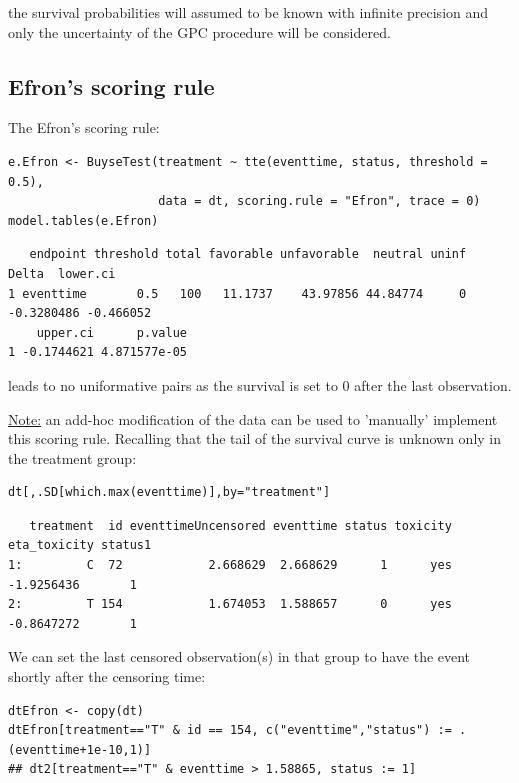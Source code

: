 \documentclass[12pt]{article}
\begin{document}
the survival probabilities will assumed to be known with infinite
precision and only the uncertainty of the GPC procedure will be
considered.

\subsection{Efron's scoring rule}
\label{sec:org9d66204}

The Efron's scoring rule:
\lstset{language=r,label= ,caption= ,captionpos=b,numbers=none}
\begin{lstlisting}
e.Efron <- BuyseTest(treatment ~ tte(eventtime, status, threshold = 0.5),
                     data = dt, scoring.rule = "Efron", trace = 0)
model.tables(e.Efron)
\end{lstlisting}

\begin{verbatim}
   endpoint threshold total favorable unfavorable  neutral uninf      Delta  lower.ci
1 eventtime       0.5   100   11.1737    43.97856 44.84774     0 -0.3280486 -0.466052
    upper.ci      p.value
1 -0.1744621 4.871577e-05
\end{verbatim}


leads to no uniformative pairs as the survival is set to 0 after the
last observation. 

\uline{Note:} an add-hoc modification of the data can be used to 'manually'
implement this scoring rule. Recalling that the tail of the survival
curve is unknown only in the treatment group:
\lstset{language=r,label= ,caption= ,captionpos=b,numbers=none}
\begin{lstlisting}
dt[,.SD[which.max(eventtime)],by="treatment"]
\end{lstlisting}

\begin{verbatim}
   treatment  id eventtimeUncensored eventtime status toxicity eta_toxicity status1
1:         C  72            2.668629  2.668629      1      yes   -1.9256436       1
2:         T 154            1.674053  1.588657      0      yes   -0.8647272       1
\end{verbatim}


We can set the last censored observation(s) in that group to have the
event shortly after the censoring time:
\lstset{language=r,label= ,caption= ,captionpos=b,numbers=none}
\begin{lstlisting}
dtEfron <- copy(dt)
dtEfron[treatment=="T" & id == 154, c("eventtime","status") := .(eventtime+1e-10,1)]
## dt2[treatment=="T" & eventtime > 1.58865, status := 1]
\end{lstlisting}
\end{document}
